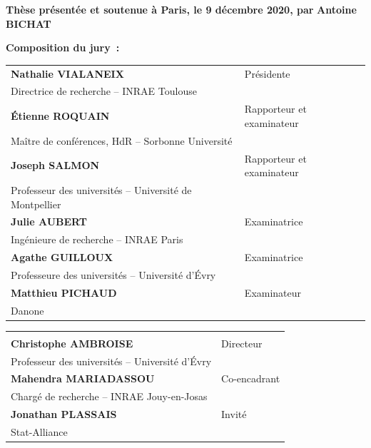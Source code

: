 \documentclass[12pt,a4paper]{reedthesis}
\theoremstyle{definition}
\theoremstyle{definition}
\theoremstyle{definition}
\theoremstyle{remark}
\begin{document}
\begin{titlepage}
\vspace{10mm}

\textbf{Thèse présentée et soutenue à Paris, le 9 décembre 2020, par}
\bigskip
\Large {\color{Prune} \textbf{Antoine BICHAT}}


\vspace{15mm}


\flushleft \normalsize \textbf{Composition du jury~:}
\bigskip


\scriptsize
\begin{tabular}{|p{8cm}l}
\arrayrulecolor{Prune}
\textbf{Nathalie VIALANEIX} &  Présidente\\
Directrice de recherche -- INRAE Toulouse & \\
\textbf{Étienne ROQUAIN} &  Rapporteur et examinateur\\
Maître de conférences, HdR -- Sorbonne Université & \\
\textbf{Joseph SALMON} &  Rapporteur et examinateur\\
Professeur des universités -- Université de Montpellier & \\
\textbf{Julie AUBERT} &  Examinatrice\\
Ingénieure de recherche -- INRAE Paris & \\
\textbf{Agathe GUILLOUX} &  Examinatrice\\
Professeure des universités -- Université d'Évry & \\
\textbf{Matthieu PICHAUD} &  Examinateur\\
Danone & \\
\end{tabular}
\begin{tabular}{p{8cm}l}
& \\
\textbf{Christophe AMBROISE} &  Directeur\\
Professeur des universités -- Université d'Évry & \\
\textbf{Mahendra MARIADASSOU} &  Co-encadrant\\
Chargé de recherche -- INRAE Jouy-en-Josas & \\
\textbf{Jonathan PLASSAIS} &  Invité\\
Stat-Alliance & \\
\end{tabular}
\end{titlepage}
\frontmatter %
\pagestyle{empty} %
\end{document}
